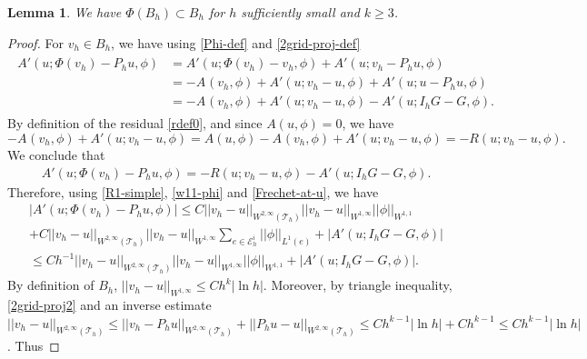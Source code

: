 \documentclass[12pt]{amsart}
\numberwithin{equation}{section}
\newtheorem{lemma}[thm]{Lemma}
\begin{document}
\begin{lemma} \label{invariant}
We have $\Phi( B_h) \subset  B_h$ for $h$ sufficiently small and $k \geq 3$.
\end{lemma}
\begin{proof}
For $v_h \in B_h$, %
we have using \eqref{Phi-def} and \eqref{2grid-proj-def}
\begin{align*}
\begin{split}
A'(u;\Phi( v_h)- P_h u,\phi) %
&= A'(u;\Phi( v_h)-  v_h,\phi)+A'(u; v_h- P_h u,\phi) \\
&= -A_{}( v_h,\phi) + A'(u; v_h-  u,\phi) +  A'(u; u - P_h u,\phi) \\
&= -A_{}( v_h,\phi) + A'(u; v_h-  u,\phi) - A'(u;I_h G - G, \phi). 
\end{split}
\end{align*}
By definition of the residual \eqref{rdef0}, and since $A(u,\phi)=0$, we have
$$
-A_{}( v_h,\phi) + A'(u; v_h-  u,\phi) = A(u,\phi) -A_{}( v_h,\phi) + A'(u; v_h-  u,\phi) = -R(u;v_h-u,\phi).
$$
We conclude that
\begin{align} \label{expr-inv}
A'(u;\Phi( v_h)- P_h u,\phi) = -R(u;v_h-u,\phi) - A'(u;I_h G - G, \phi).
\end{align}
Therefore, using \eqref{R1-simple}, \eqref{w11-phi} and \eqref{Frechet-at-u}, we have %
\begin{multline*}
| A'(u;\Phi( v_h)- P_h u,\phi)   | \leq C || v_h-u ||_{W^{2,\infty}(\mathcal{T}_h)}  ||  v_h-u ||_{W^{1,\infty}}  || \phi ||_{W^{1,1}} \\ +C  ||  v_h-u ||_{W^{2,\infty}(\mathcal{T}_h)}  ||  v_h-u ||_{W^{1,\infty}} 
 \sum_{e \in \mathcal{E}_h^i } || \phi ||_{L^1(e)} +  |A'(u;I_h G - G, \phi) | \\
 \leq C h^{-1} || v_h-u ||_{W^{2,\infty}(\mathcal{T}_h)}  ||  v_h-u ||_{W^{1,\infty}}  || \phi ||_{W^{1,1}} + |A'(u;I_h G - G, \phi)|.
\end{multline*}
By definition of $B_h$,  $||v_h-u||_{W^{1,\infty}} \leq C h^{k} |\ln h |$. 
Moreover, by triangle inequality, \eqref{2grid-proj2}
and an inverse estimate
$||v_h-u||_{W^{2,\infty}(\mathcal{T}_h)} \leq ||v_h-P_h u||_{W^{2,\infty}(\mathcal{T}_h)} + ||P_h u-u||_{W^{2,\infty}(\mathcal{T}_h)} \leq C h^{k-1} |\ln h | + C h^{k-1}  \leq C h^{k-1} |\ln h | $. Thus

\end{proof}
\end{document}
